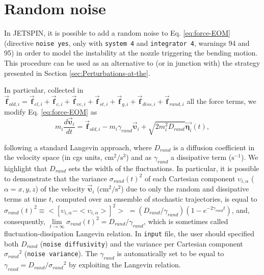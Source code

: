 
\section{Random noise\label{sec:Random-noise}}

In JETSPIN, it is possible to add a random noise to Eq. \ref{eq:force-EOM}
(directive \texttt{noise yes}, only with \texttt{system 4} and
\texttt{integrator 4}, warnings 94 and 95)
in order to model the instability at the nozzle triggering the bending
motion. This procedure can be used as an alternative to (or in junction
with) the strategy presented in Section \ref{sec:Perturbations-at-the}.

In particular, collected in $\vec{\textbf{f}}_{old,i}=\vec{\textbf{f}}_{el,i}+\vec{\textbf{f}}_{c,i}+\vec{\textbf{f}}_{\upsilon e,i}+\vec{\textbf{f}}_{st,i}+\vec{\textbf{f}}_{g,i}+\vec{\textbf{f}}_{diss,i}+\vec{\textbf{f}}_{rand,i}$
all the force terms, we modify Eq. \ref{eq:force-EOM} as
\begin{equation}
m_{i}\frac{d\vec{\boldsymbol{\upsilon}}_{i}}{dt}=\vec{\textbf{f}}_{old,i}-m_{i}\gamma_{rand}\vec{\boldsymbol{\upsilon}}_{i}+\sqrt{2m_{i}^{2}D_{rand}}\vec{\boldsymbol{\eta}_{i}}(t),
\end{equation}

following a standard Langevin approach, where $D_{rand}$ is a diffusion
coefficient in the velocity space (in cgs units, $\text{cm}^{2}/\text{s}^{3}$)
and as $\gamma_{rand}$ a dissipative term ($\text{s}^{-1}$). We
highlight that $D_{rand}$ sets the width of the fluctuations. In
particular, it is possible to demonstrate \cite{gillespie2012simple}
that the variance $\sigma_{rand}\left(t\right)^{2}$ of each Cartesian
component $\upsilon_{i,\alpha}$ ($\alpha=x,y,z$) of the velocity
$\vec{\boldsymbol{\upsilon}}_{i}$ ($\text{cm}^{2}/\text{s}^{2}$)
due to only the random and dissipative terms at time $t$, computed
over an ensemble of stochastic trajectories, is equal to $\sigma_{rand}\left(t\right)^{2}\equiv$$<\left[\upsilon_{i,\alpha}-<\upsilon_{i,\alpha}>\right]^{2}>$
$=\left(D_{rand}/\gamma_{rand}\right)\left(1-e^{-2\gamma_{rand}t}\right)$,
and, consequently, $\lim\limits _{t\rightarrow\infty}\sigma_{rand}\left(t\right)^{2}=D_{rand}/\gamma_{rand}$,
which is sometimes called fluctuation-dissipation Langevin relation.
In \texttt{input} file, the user should specified both $D_{rand}$
(\texttt{noise diffusivity}) and the variance per Cartesian component
$\sigma_{rand}{}^{2}$ (\texttt{noise variance}). The $\gamma_{rand}$ is automatically
set to be equal to $\gamma_{rand}=D_{rand}/\sigma_{rand}{}^{2}$ by
exploiting the Langevin relation.

